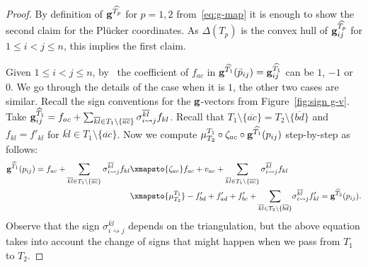 \documentclass[pdftex]{sigma}%
\numberwithin{equation}{section}
\begin{document}
\begin{proof}
By definition of ${\bf g}^{\widehat{T_p}}$ for $p=1,2$ from~\eqref{eq:g-map} it is enough to show the second claim for the Pl\"ucker coordinates.
As $\Delta(T_p)$ is the convex hull of ${\bf g}^{\widehat{T_p}}_{ij}$ for $1\le i<j\le n$, this implies the first claim.

Given $1\le i<j\le n$, by~
the coefficient of $f_{ac}$ in ${\bf g}^{\widehat{T_1}}(\bar p_{ij})={\bf g}^{\widehat{T_1}}_{ij}$ can be $1$, $-1$ or~$0$.
We go through the details of the case when it is $1$, the other two cases are similar.
Recall the sign conventions for the ${\bf g}$-vectors from Figure~\ref{fig:sign g-v}.
Take
${\bf g}^{\widehat{T}_1}_{ij}= f_{ac}+\sum_{\overline{kl}\in T_1\setminus \{\overline{ac}\} } \sigma_{i \rightsquigarrow j}^{\overline{kl}} f_{kl}$.
Recall that $T_1\setminus \{\overline{ac}\}= T_2\setminus \big\{\overline{bd}\big\}$ and $f_{kl}=f'_{kl}$ for $\overline{kl}\in T_1 \setminus \{ \overline{ac} \}$. Now we compute $\mu^{T_1}_{T_2} \circ \zeta_{ac} \circ {\bf g}^{\widehat{T_1}}(p_{ij})$ step-by-step as follows:
\begin{align*}
{\bf g}^{\widehat{T}_1}(p_{ij}) = f_{ac} + \sum_{\overline{kl}\in T_1 \setminus \{ \overline{ac} \} } \sigma_{i \rightsquigarrow j}^{\overline{kl}} f_{kl} &\xmapsto{\zeta_{ac}} f_{ac} + v_{ac} + \sum_{\overline{kl}\in T_1 \setminus \{ \overline{ac} \} } \sigma_{i \rightsquigarrow j}^{\overline{kl}} f_{kl} \\
&\xmapsto{\mu^{T_1}_{T_2}} -f'_{bd}+f'_{ad}+f'_{bc}+\displaystyle{\sum_{\overline{kl}\in T_2\setminus \{ \overline{bd} \} }} \sigma_{i \rightsquigarrow j}^{\overline{kl}} f'_{kl} = {\bf g}^{\widehat{T}_2}(p_{ij}).
\end{align*}
Observe that the sign $\sigma_{i \rightsquigarrow j}^{\overline{kl}}$ depends on the triangulation, but the above equation takes into account the change of signs that might happen when we pass from $T_1$ to $T_2$.
\end{proof}
\end{document}

